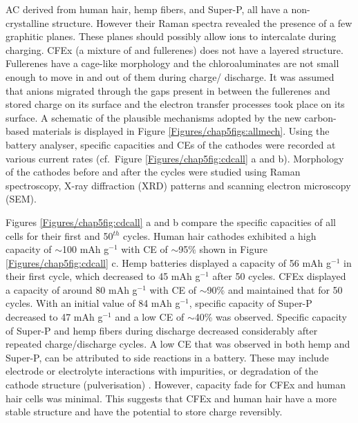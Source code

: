 AC derived from human hair, hemp fibers, and Super-P, all have a non- crystalline structure. However their Raman spectra revealed the presence of a few graphitic planes. These planes should possibly allow  ions to intercalate during charging. CFEx (a mixture of  and  fullerenes) does not have a layered structure. Fullerenes have a cage-like morphology and the chloroaluminates are not small enough to move in and out of them during charge/ discharge. It was assumed that  anions migrated through the gaps present in between the fullerenes and stored charge on its surface and the electron transfer processes took place on its surface. A schematic of the plausible mechanisms adopted by the new carbon-based materials is displayed in Figure \ref{Figures/chap5figs:allmech}. Using the battery analyser, specific capacities and CEs of the cathodes were recorded at various current rates (cf.\ Figure \ref{Figures/chap5fig:cdcall} a and b). Morphology of the cathodes before and after the cycles were studied using Raman spectroscopy, X-ray diffraction (XRD) patterns and scanning electron microscopy (SEM).

Figures \ref{Figures/chap5fig:cdcall} a and b compare the specific capacities of all cells for their first and 50$^{th}$ cycles. Human hair cathodes exhibited a high capacity of $\sim$100 mAh g$^{-1}$ with CE of $\sim$95$\%$ shown in Figure \ref{Figures/chap5fig:cdcall} c. Hemp batteries displayed a capacity of 56 mAh g$^{-1}$ in their first cycle, which decreased to 45 mAh g$^{-1}$ after 50 cycles. CFEx displayed a capacity of around 80 mAh g$^{-1}$ with CE of $\sim$90\% and maintained that for 50 cycles. With an initial value of 84 mAh g$^{-1}$, specific capacity of Super-P decreased to 47 mAh g$^{-1}$ and a low CE of $\sim$40\% was observed. Specific capacity of Super-P and hemp fibers during discharge decreased considerably after repeated charge/discharge cycles. A low CE that was observed in both hemp and Super-P, can be attributed to side reactions in a battery. These may include electrode or electrolyte interactions with impurities, or degradation of the cathode structure (pulverisation) \cite{gyenes_understanding_2015}. However, capacity fade for CFEx and human hair cells was minimal. This suggests that CFEx and human hair have a more stable structure and have the potential to store charge reversibly.\\


